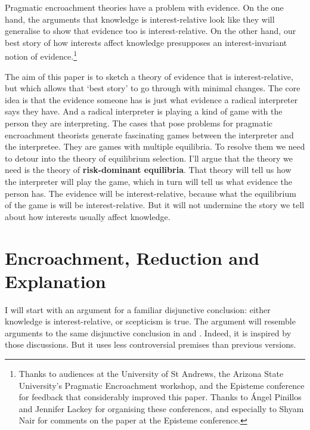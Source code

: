 \def\mytitle{Interests, Evidence and Games}
\def\shorttitle{Interests and Evidence}
\def\myauthor{Brian Weatherson}
\def\latexmode{Book}


Pragmatic encroachment theories have a problem with evidence. On the one hand, the arguments that knowledge is interest-relative look like they will generalise to show that evidence too is interest-relative. On the other hand, our best story of how interests affect knowledge presupposes an interest-invariant notion of evidence.\footnote{Thanks to audiences at the University of St Andrews, the Arizona State University's Pragmatic Encroachment workshop, and the Episteme conference for feedback that considerably improved this paper. Thanks to Ángel Pinillos and Jennifer Lackey for organising these conferences, and especially to Shyam Nair for comments on the paper at the Episteme conference.}

The aim of this paper is to sketch a theory of evidence that is interest-relative, but which allows that `best story' to go through with minimal changes. The core idea is that the evidence someone has is just what evidence a radical interpreter says they have. And a radical interpreter is playing a kind of game with the person they are interpreting. The cases that pose problems for pragmatic encroachment theorists generate fascinating games between the interpreter and the interpretee. They are games with multiple equilibria. To resolve them we need to detour into the theory of equilibrium selection. I'll argue that the theory we need is the theory of \textbf{risk-dominant equilibria}. That theory will tell us how the interpreter will play the game, which in turn will tell us what evidence the person has. The evidence will be interest-relative, because what the equilibrium of the game is will be interest-relative. But it will not undermine the story we tell about how interests usually affect knowledge.

\section{Encroachment, Reduction and Explanation}
\label{encroachmentreductionandexplanation}

I will start with an argument for a familiar disjunctive conclusion: either knowledge is interest-relative, or scepticism is true. The argument will resemble arguments to the same disjunctive conclusion in \citet{Hawthorne2004} and \citet{FantlMcGrath2009}. Indeed, it is inspired by those discussions. But it uses less controversial premises than previous versions.


